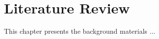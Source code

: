 
\chapter{Literature Review}\label{Ch:2}
\vspace{30pt}


This chapter presents the background materials ...



